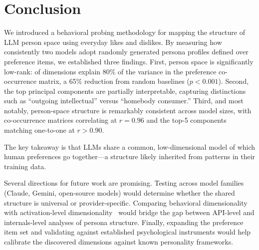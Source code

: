 \section{Conclusion}
\label{sec:conclusion}

We introduced a behavioral probing methodology for mapping the structure of LLM person space using everyday likes and dislikes.
By measuring how consistently two models adopt \nprofiles{} randomly generated persona profiles defined over \nprefs{} preference items, we established three findings.
First, person space is significantly low-rank: \effrank{} of \nprefs{} dimensions explain 80\% of the variance in the preference co-occurrence matrix, a 65\% reduction from random baselines ($p < 0.001$).
Second, the top principal components are partially interpretable, capturing distinctions such as ``outgoing intellectual'' versus ``homebody consumer.''
Third, and most notably, person-space structure is remarkably consistent across model sizes, with co-occurrence matrices correlating at $r = 0.96$ and the top-5 components matching one-to-one at $r > 0.90$.

The key takeaway is that LLMs share a common, low-dimensional model of which human preferences go together---a structure likely inherited from patterns in their training data.

Several directions for future work are promising.
Testing across model families (Claude, Gemini, open-source models) would determine whether the shared structure is universal or provider-specific.
Comparing behavioral dimensionality with activation-level dimensionality~\citep{chen2025persona} would bridge the gap between API-level and internals-level analyses of persona structure.
Finally, expanding the preference item set and validating against established psychological instruments would help calibrate the discovered dimensions against known personality frameworks.
